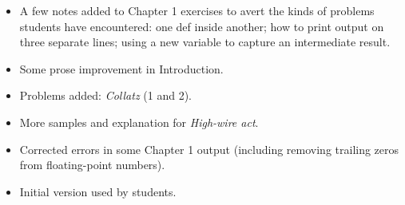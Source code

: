 {
\begin{itemize}
  \item A few notes added to Chapter 1 exercises to avert the kinds of problems students
    have encountered: one def inside another; how to print output on three separate lines;
    using a new variable to capture an intermediate result.
  \item Some prose improvement in Introduction.
  \item Problems added: \emph{Collatz} (1 and 2).
  \item More samples and explanation for \emph{High-wire act}.
  \item Corrected errors in some Chapter 1 output (including removing trailing zeros from
    floating-point numbers).
\end{itemize}

\begin{itemize}
  \item Initial version used by students.
\end{itemize}

}

